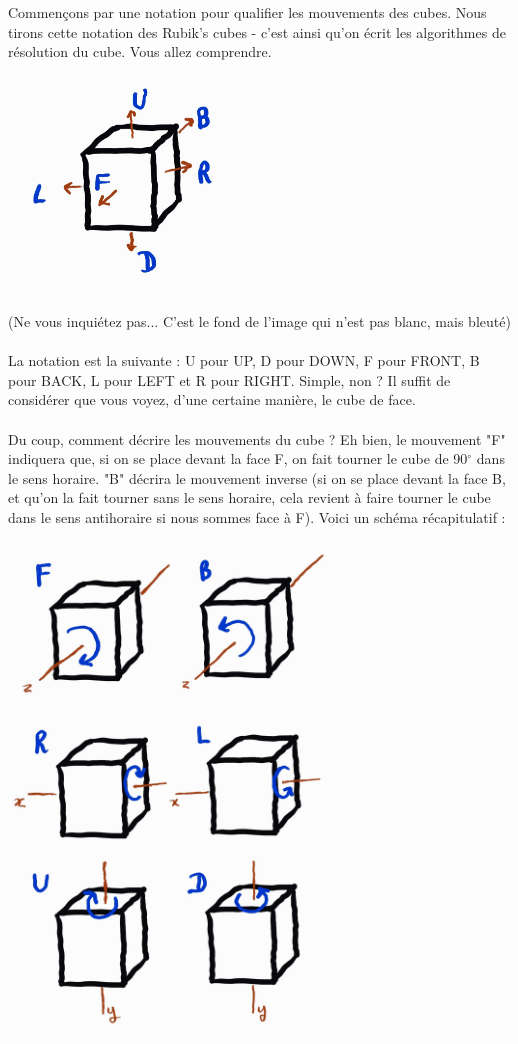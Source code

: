 Commençons par une notation pour qualifier les mouvements des cubes. Nous tirons cette notation des Rubik's cubes - c'est ainsi qu'on écrit les algorithmes de résolution du cube. Vous allez comprendre.
\begin{center}
\includegraphics[width=200pt]{Rubik1.jpg}
\end{center}
(Ne vous inquiétez pas... C'est le fond de l'image qui n'est pas blanc, mais bleuté)
\\\\
La notation est la suivante : U pour UP, D pour DOWN, F pour FRONT, B pour BACK, L pour LEFT et R pour RIGHT. Simple, non ? Il suffit de considérer que vous voyez, d'une certaine manière, le cube de face.
\\\\
Du coup, comment décrire les mouvements du cube ? Eh bien, le mouvement "F" indiquera que, si on se place devant la face F, on fait tourner le cube de 90$^{\circ}$ dans le sens horaire. "B" décrira le mouvement inverse (si on se place devant la face B, et qu'on la fait tourner sans le sens horaire, cela revient à faire tourner le cube dans le sens antihoraire si nous sommes face à F). Voici un schéma récapitulatif :
\begin{center}
\includegraphics[width=250pt]{Rubik2.jpg}
\end{center}
